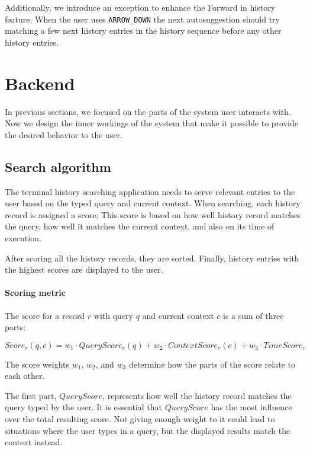 Additionally, we introduce an exception to enhance the Forward in history feature. 
When the user uses \verb|ARROW_DOWN| the next autosuggestion should try matching a few next history entries in the history sequence before any other history entries. 

\section{Backend}

In previous sections, we focused on the parts of the system user interacts with.
Now we design the inner workings of the system that make it possible to provide the desired behavior to the user.

\subsection{Search algorithm}

The terminal history searching application needs to serve relevant entries to the user based on the typed query and current context. When searching, each history record is assigned a score; This score is based on how well history record matches the query, how well it matches the current context, and also on its time of execution. 

After scoring all the history records, they are sorted. Finally, history entries with the highest scores are displayed to the user.

\paragraph{Scoring metric}

The score for a record \(r\) with query \(q\) and current context \(c\) is a sum of three parts: 

\[ Score_r(q,c) = w_1 \cdot QueryScore_r(q) + w_2 \cdot ContextScore_r(c) + w_3 \cdot TimeScore_r \]

The score weights \(w_1\), \(w_2\), and \(w_3\) determine how the parts of the score relate to each other. 

The first part, \(QueryScore\), represents how well the history record matches the query typed by the user. It is essential that \(QueryScore\) has the most influence over the total resulting score. Not giving enough weight to it could lead to situations where the user types in a query, but the displayed results match the context instead. 

